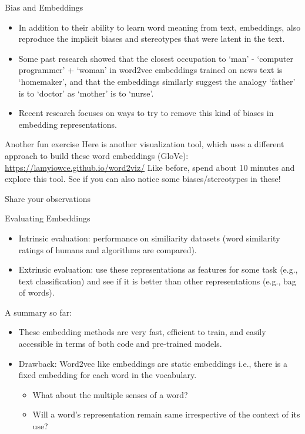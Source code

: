 \documentclass{beamer}
\begin{document}
\begin{frame}{Bias and Embeddings}
    \begin{itemize}
        \item In addition to their ability to learn word meaning from text, embeddings, also reproduce the implicit biases and stereotypes that were latent in the text.
        \item Some past research showed that the closest occupation to ‘man’ - ‘computer programmer’ + ‘woman’ in word2vec embeddings trained on news text is ‘homemaker’, and that the embeddings similarly suggest the analogy
‘father’ is to ‘doctor’ as ‘mother’ is to ‘nurse’.
\item Recent research focuses on ways to try to remove this kind of biases in embedding representations. 
    \end{itemize}
\end{frame}

\begin{frame}{Another fun exercise}
    Here is another visualization tool, which uses a different approach to build these word embeddings (GloVe): \url{https://lamyiowce.github.io/word2viz/}
    Like before, spend about 10 minutes and explore this tool. See if you can also notice some biases/stereotypes in these!
\end{frame}

\begin{frame}{}
    \large Share your observations
\end{frame}


\begin{frame}{Evaluating Embeddings}
    \begin{itemize}
        \item Intrinsic evaluation: performance on similiarity datasets (word similarity ratings of humans and algorithms are compared).
        \item Extrinsic evaluation: use these representations as features for some task (e.g., text classification) and see if it is better than other representations (e.g., bag of words).
    \end{itemize}
\end{frame}

\begin{frame}{A summary so far: }
\begin{itemize}
    \item These embedding methods are very fast, efficient to train, and easily accessible in terms of both code and pre-trained models.
    \item Drawback: Word2vec like embeddings are static embeddings i.e., there is a fixed embedding for each word in the vocabulary.
    \begin{itemize}
        \item What about the multiple senses of a word?
        \item Will a word's representation remain same irrespective of the context of its use? 
    \end{itemize}
\end{itemize}
\end{frame}
\end{document}
